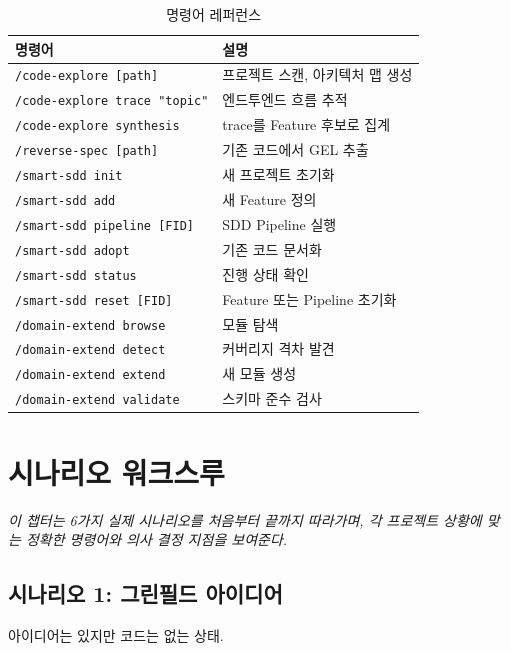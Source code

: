 \documentclass[11pt,a4paper,openright,twoside]{report}
\begin{document}
\begin{table}[H]
\centering
\caption{명령어 레퍼런스}
\label{tab:cli}
\begin{tabularx}{\textwidth}{lX}
\toprule
\textbf{명령어} & \textbf{설명} \\
\midrule
\texttt{/code-explore [path]} & 프로젝트 스캔, 아키텍처 맵 생성 \\
\texttt{/code-explore trace "topic"} & 엔드투엔드 흐름 추적 \\
\texttt{/code-explore synthesis} & trace를 Feature 후보로 집계 \\
\texttt{/reverse-spec [path]} & 기존 코드에서 GEL 추출 \\
\texttt{/smart-sdd init} & 새 프로젝트 초기화 \\
\texttt{/smart-sdd add} & 새 Feature 정의 \\
\texttt{/smart-sdd pipeline [FID]} & SDD Pipeline 실행 \\
\texttt{/smart-sdd adopt} & 기존 코드 문서화 \\
\texttt{/smart-sdd status} & 진행 상태 확인 \\
\texttt{/smart-sdd reset [FID]} & Feature 또는 Pipeline 초기화 \\
\texttt{/domain-extend browse} & 모듈 탐색 \\
\texttt{/domain-extend detect} & 커버리지 격차 발견 \\
\texttt{/domain-extend extend} & 새 모듈 생성 \\
\texttt{/domain-extend validate} & 스키마 준수 검사 \\
\bottomrule
\end{tabularx}
\end{table}


\chapter{시나리오 워크스루}
\label{ch:scenarios}

\textit{이 챕터는 6가지 실제 시나리오를 처음부터 끝까지 따라가며, 각 프로젝트 상황에 맞는 정확한 명령어와 의사 결정 지점을 보여준다.}

\section{시나리오 1: 그린필드 아이디어}

아이디어는 있지만 코드는 없는 상태.
\end{document}
